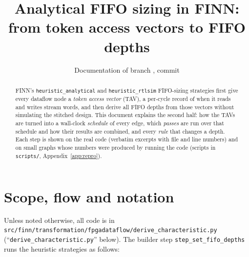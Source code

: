 \documentclass[10pt,a4paper]{article}
\title{Analytical FIFO sizing in FINN:\\ from token access vectors to FIFO depths}
\author{Documentation of branch \code{feature/dev/analytical-fifo-sizing}, commit \code{4ce1bd188}}
\date{}
\newcommand{\code}[1]{\texttt{#1}}
\newcommand{\file}{\code{derive\_characteristic.py}}
\begin{document}
\maketitle

\begin{abstract}
FINN's \code{heuristic\_analytical} and \code{heuristic\_rtlsim} FIFO-sizing
strategies first give every dataflow node a \emph{token access vector} (TAV), a
per-cycle record of when it reads and writes stream words, and then derive all
FIFO depths from those vectors without simulating the stitched design. This
document explains the second half: how the TAVs are turned into a wall-clock
\emph{schedule} of every edge, which \emph{passes} are run over that schedule and
how their results are combined, and every \emph{rule} that changes a depth. Each
step is shown on the real code (verbatim excerpts with file and line numbers)
and on small graphs whose numbers were produced by running the code (scripts in
\code{scripts/}, Appendix~\ref{app:repro}).
\end{abstract}

\tableofcontents

\section{Scope, flow and notation}

Unless noted otherwise, all code is in
\code{src/finn/transformation/fpgadataflow/derive\_characteristic.py} (``\file''
below). The builder step \code{step\_set\_fifo\_depths} runs the heuristic strategies as follows:
\end{document}
